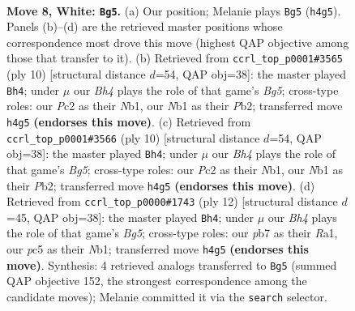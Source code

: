 \documentclass[11pt]{article}
\begin{document}
\begin{figure}[p]\centering
\begin{subfigure}{0.46\textwidth}\centering
\resizebox{\linewidth}{!}{%
\newchessgame
\chessboard[
  setfen={rnbqr1k1/pp3ppp/3bpn2/2pp4/3P3B/3BPN2/PPP2PPP/RN1QK2R w KQ - 2 8},
  showmover=false,
  pgfstyle=straightmove, color=movearrow, markmove={h4-g5}
]}
\caption{}
\end{subfigure}\hfill
\begin{subfigure}{0.46\textwidth}\centering
\resizebox{\linewidth}{!}{%
\newchessgame
\chessboard[
  setfen={r1bqk2r/pppp1pp1/2n2n1p/2b1p1B1/2B1P3/3P1N2/PPP2PPP/RN1QK2R w KQkq - 0 6},
  showmover=false,
  pgfstyle=straightmove, color=movearrow, markmove={g5-h4}
]}
\caption{}
\end{subfigure}
\\[4pt]
\begin{subfigure}{0.46\textwidth}\centering
\resizebox{\linewidth}{!}{%
\newchessgame
\chessboard[
  setfen={r1bqk2r/pppp1pp1/2n2n1p/2b1p1B1/2B1P3/3P1N2/PPP2PPP/RN1QK2R w KQkq - 0 6},
  showmover=false,
  pgfstyle=straightmove, color=movearrow, markmove={g5-h4}
]}
\caption{}
\end{subfigure}\hfill
\begin{subfigure}{0.46\textwidth}\centering
\resizebox{\linewidth}{!}{%
\newchessgame
\chessboard[
  setfen={r1bq1rk1/pppp1pp1/2n2n1p/2b1p1B1/2B1P3/2PP1N2/PP3PPP/RN1QK2R w KQ - 0 7},
  showmover=false,
  pgfstyle=straightmove, color=movearrow, markmove={g5-h4}
]}
\caption{}
\end{subfigure}
\caption{\textbf{Move 8, White: \texttt{Bg5}.} (a) Our position; Melanie plays \texttt{Bg5} (\texttt{h4g5}). Panels (b)--(d) are the retrieved master positions whose correspondence most drove this move (highest QAP objective among those that transfer to it). (b) Retrieved from \texttt{ccrl\_top\_p0001\#3565} (ply 10) [structural distance $d$=54, QAP obj=38]: the master played \texttt{Bh4}; under $\mu$ our \emph{Bh4} plays the role of that game's \emph{Bg5}; cross-type roles: our \emph{P}c2 as their \emph{N}b1, our \emph{N}b1 as their \emph{P}b2; transferred move \texttt{h4g5} \textbf{(endorses this move)}. (c) Retrieved from \texttt{ccrl\_top\_p0001\#3566} (ply 10) [structural distance $d$=54, QAP obj=38]: the master played \texttt{Bh4}; under $\mu$ our \emph{Bh4} plays the role of that game's \emph{Bg5}; cross-type roles: our \emph{P}c2 as their \emph{N}b1, our \emph{N}b1 as their \emph{P}b2; transferred move \texttt{h4g5} \textbf{(endorses this move)}. (d) Retrieved from \texttt{ccrl\_top\_p0000\#1743} (ply 12) [structural distance $d$=45, QAP obj=38]: the master played \texttt{Bh4}; under $\mu$ our \emph{Bh4} plays the role of that game's \emph{Bg5}; cross-type roles: our \emph{p}b7 as their \emph{R}a1, our \emph{p}c5 as their \emph{N}b1; transferred move \texttt{h4g5} \textbf{(endorses this move)}. Synthesis: 4 retrieved analogs transferred to \texttt{Bg5} (summed QAP objective 152, the strongest correspondence among the candidate moves); Melanie committed it via the \texttt{search} selector.}
\label{fig:thought-m14}
\end{figure}
\end{document}
